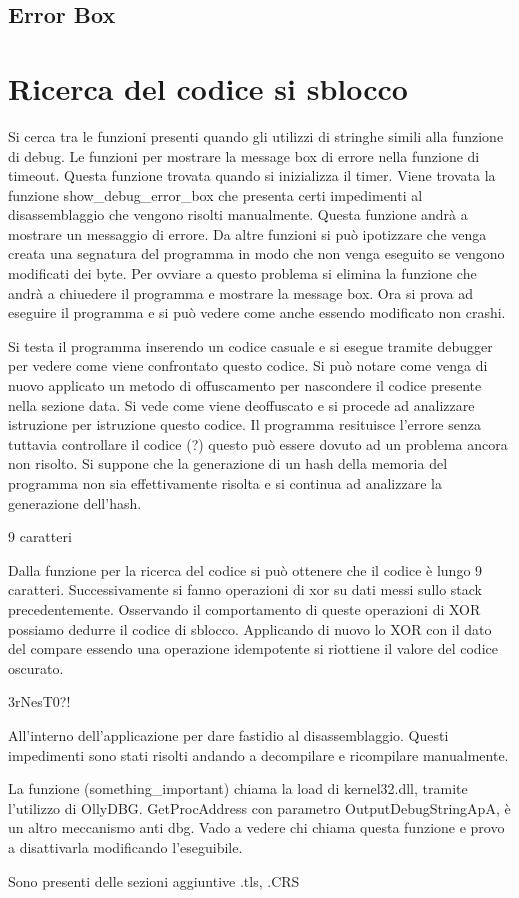 \documentclass[a4paper,10pt]{article}
\begin{document}
\subsection{Error Box}

\section{Ricerca del codice si sblocco}


Si cerca tra le funzioni presenti quando gli utilizzi di stringhe simili alla funzione di debug. Le funzioni per mostrare la message box di errore nella funzione di timeout. Questa funzione trovata quando si inizializza il timer.
Viene trovata la funzione show\_debug\_error\_box che presenta certi impedimenti al disassemblaggio che vengono risolti manualmente. Questa funzione andrà a mostrare un messaggio di errore. Da altre funzioni si può ipotizzare che venga creata una segnatura del programma in modo che non venga eseguito se vengono modificati dei byte. Per ovviare a questo problema si elimina la funzione che andrà a chiuedere il programma e mostrare la message box.
Ora si prova ad eseguire il programma e si può vedere come anche essendo modificato non crashi.

Si testa il programma inserendo un codice casuale e si esegue tramite debugger per vedere come viene confrontato questo codice. Si può notare come venga di nuovo applicato un metodo di offuscamento per nascondere il codice presente nella sezione data. Si vede come viene deoffuscato e si procede ad analizzare istruzione per istruzione questo codice. Il programma resituisce l'errore senza tuttavia controllare il codice (?) questo può essere dovuto ad un problema ancora non risolto. Si suppone che la generazione di un hash della memoria del programma non sia effettivamente risolta e si continua ad analizzare la generazione dell'hash.


9 caratteri

Dalla funzione per la ricerca del codice si può ottenere che il codice è lungo 9 caratteri. Successivamente si fanno operazioni di xor su dati messi sullo stack precedentemente. Osservando il comportamento di queste operazioni di XOR possiamo dedurre il codice di sblocco. Applicando di nuovo lo XOR con il dato del compare essendo una operazione idempotente si riottiene il valore del codice oscurato.

3rNesT0?!

All'interno dell'applicazione per dare fastidio al disassemblaggio. Questi impedimenti sono stati risolti andando a decompilare e ricompilare manualmente.



La funzione (something\_important) chiama la load di kernel32.dll, tramite l'utilizzo di OllyDBG. GetProcAddress con parametro OutputDebugStringApA, è un altro meccanismo anti dbg. Vado a vedere chi chiama questa funzione e provo a disattivarla modificando l'eseguibile.

Sono presenti delle sezioni aggiuntive .tls, .CRS
\end{document}
